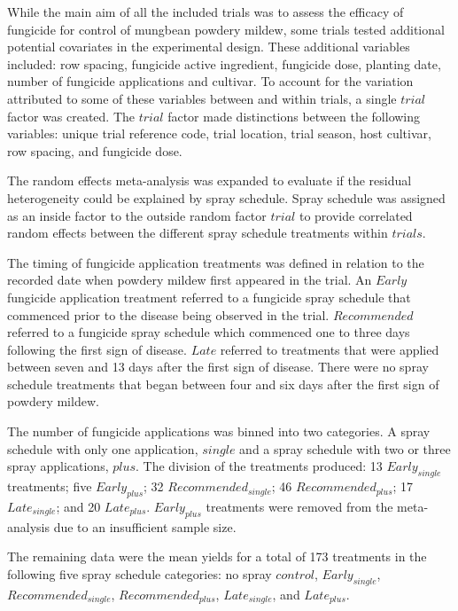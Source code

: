 \documentclass[agronomy,article,submit,moreauthors,pdftex]{mdpi}
\begin{document}
While the main aim of all the included trials was to assess the efficacy of fungicide for control of mungbean powdery mildew, some trials tested additional potential covariates in the experimental design.
These additional variables included: row spacing, fungicide active ingredient, fungicide dose, planting date, number of fungicide applications and cultivar.
To account for the variation attributed to some of these variables between and within trials, a single \(trial\) factor was created.
The \(trial\) factor made distinctions between the following variables: unique trial reference code, trial location, trial season, host cultivar, row spacing, and fungicide dose.

The random effects meta-analysis was expanded to evaluate if the residual heterogeneity could be explained by spray schedule.
Spray schedule was assigned as an inside factor to the outside random factor \(trial\) to provide correlated random effects between the different spray schedule treatments within \(trials\).

The timing of fungicide application treatments was defined in relation to the recorded date when powdery mildew first appeared in the trial.
An \(Early\) fungicide application treatment referred to a fungicide spray schedule that commenced prior to the disease being observed in the trial.
\(Recommended\) referred to a fungicide spray schedule which commenced one to three days following the first sign of disease.
\(Late\) referred to treatments that were applied between seven and 13 days after the first sign of disease.
There were no spray schedule treatments that began between four and six days after the first sign of powdery mildew.

The number of fungicide applications was binned into two categories.
A spray schedule with only one application, \(single\) and a spray schedule with two or three spray applications, \(plus\).
The division of the treatments produced: 13 \(Early_{single}\) treatments; five \(Early_{plus}\); 32 \(Recommended_{single}\); 46 \(Recommended_{plus}\); 17 \(Late_{single}\); and 20 \(Late_{plus}\).
\(Early_{plus}\) treatments were removed from the meta-analysis due to an insufficient sample size.

The remaining data were the mean yields for a total of 173 treatments in the following five spray schedule categories: no spray \(control\), \(Early_{single}\), \(Recommended_{single}\), \(Recommended_{plus}\), \(Late_{single}\), and \(Late_{plus}\).
\end{document}
